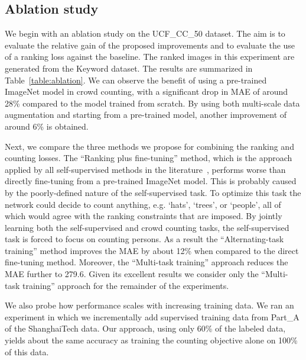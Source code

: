 \documentclass[10pt,twocolumn,letterpaper]{article}
\begin{document}
\subsection{Ablation study}
We begin with an ablation study on the UCF\_CC\_50 dataset. The aim is
to evaluate the relative gain of the proposed improvements and
to evaluate the use of a ranking loss against the baseline. The ranked
images in this experiment are generated from the Keyword dataset. The results are summarized in Table~\ref{table:ablation}. We can observe the benefit of using a pre-trained ImageNet model in crowd counting, with a significant drop in MAE of around 28\% compared to the model trained from scratch. By using both multi-scale data augmentation and starting from a pre-trained model, another improvement of around 6\% is obtained.

Next, we compare the three methods we propose for combining the
ranking and counting losses. The ``Ranking plus fine-tuning'' method,
which is the approach applied by all self-supervised methods in the
literature~\cite{doersch2015unsupervised,pathak2016context,zhang2016colorful,noroozi2017representation,liu2017rankiqa},
performs worse than directly fine-tuning from a pre-trained ImageNet
model. This is probably caused by the poorly-defined nature of the
self-supervised task. To optimize this task the network could decide
to count anything, e.g. `hats', `trees', or `people',
all of which would agree with the ranking constraints that are
imposed. By jointly learning both the self-supervised and crowd
counting tasks, the self-supervised task is forced to focus on
counting persons. As a result the ``Alternating-task training'' method
improves the MAE by about 12\% when compared to the direct fine-tuning
method. Moreover, the ``Multi-task training'' approach reduces the MAE
further to 279.6. Given its excellent results we consider only the
``Multi-task training'' approach for the remainder of the experiments.

We also probe how performance scales with increasing training data. We
ran an experiment in which we incrementally add supervised training
data from Part\_A of the ShanghaiTech data. Our approach, using only
60\% of the labeled data, yields about the same accuracy as training
the counting objective alone on 100\% of this data.
\end{document}
